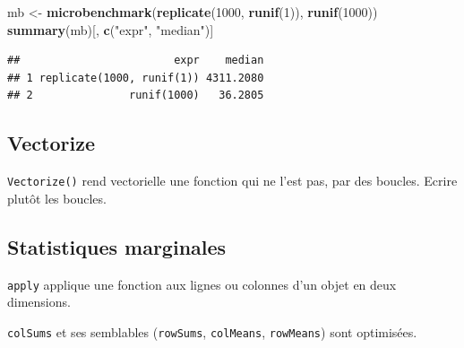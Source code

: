\documentclass[
  12pt,
  french,
  a4paper,
  extrafontsizes,onecolumn,openright
  ]{memoir}
\newenvironment{Shaded}{\begin{snugshade}}{\end{snugshade}}
\newcommand{\DecValTok}[1]{\textcolor[rgb]{0.00,0.00,0.81}{#1}}
\newcommand{\KeywordTok}[1]{\textcolor[rgb]{0.13,0.29,0.53}{\textbf{#1}}}
\newcommand{\NormalTok}[1]{#1}
\newcommand{\StringTok}[1]{\textcolor[rgb]{0.31,0.60,0.02}{#1}}
\begin{document}
\scriptsize

\begin{Shaded}
\begin{Highlighting}[]
\NormalTok{mb <-}\StringTok{ }\KeywordTok{microbenchmark}\NormalTok{(}\KeywordTok{replicate}\NormalTok{(}\DecValTok{1000}\NormalTok{, }\KeywordTok{runif}\NormalTok{(}\DecValTok{1}\NormalTok{)), }\KeywordTok{runif}\NormalTok{(}\DecValTok{1000}\NormalTok{))}
\KeywordTok{summary}\NormalTok{(mb)[, }\KeywordTok{c}\NormalTok{(}\StringTok{"expr"}\NormalTok{, }\StringTok{"median"}\NormalTok{)]}
\end{Highlighting}
\end{Shaded}

\begin{verbatim}
##                        expr    median
## 1 replicate(1000, runif(1)) 4311.2080
## 2               runif(1000)   36.2805
\end{verbatim}

\normalsize

\hypertarget{vectorize}{%
\subsection{Vectorize}\label{vectorize}}

\texttt{Vectorize()} rend vectorielle une fonction qui ne l'est pas, par des boucles.
Ecrire plutôt les boucles.

\hypertarget{statistiques-marginales}{%
\subsection{Statistiques marginales}\label{statistiques-marginales}}

\texttt{apply} applique une fonction aux lignes ou colonnes d'un objet en deux dimensions.

\texttt{colSums} et ses semblables (\texttt{rowSums}, \texttt{colMeans}, \texttt{rowMeans}) sont optimisées.

\scriptsize
\end{document}
